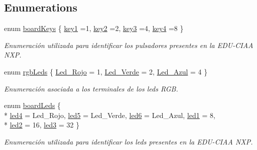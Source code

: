 \subsection*{Enumerations}
\begin{DoxyCompactItemize}
\item 
enum \hyperlink{group__hardware_ga8d70125ca4047f0f7ea513cd8568953d}{board\+Keys} \{ \hyperlink{group__hardware_gga8d70125ca4047f0f7ea513cd8568953da483a28cafb544915d9cd44f2c69fc706}{key1} =1, 
\hyperlink{group__hardware_gga8d70125ca4047f0f7ea513cd8568953dab8d9f65fc5604a8b8a0cdcbaf03bbbe0}{key2} =2, 
\hyperlink{group__hardware_gga8d70125ca4047f0f7ea513cd8568953da376c29473ae1a854ff46b2b171985093}{key3} =4, 
\hyperlink{group__hardware_gga8d70125ca4047f0f7ea513cd8568953da84011848209e666e74469d6dfba542eb}{key4} =8
 \}\begin{DoxyCompactList}\small\item\em Enumeración utilizada para identificar los pulsadores presentes en la E\+D\+U-\/\+C\+I\+AA N\+XP. \end{DoxyCompactList}
\item 
enum \hyperlink{group__hardware_ga84e58e8cc8e3fe349be97bcd3221c360}{rgb\+Leds} \{ \hyperlink{group__hardware_gga84e58e8cc8e3fe349be97bcd3221c360a5662baf6795c7030ea75e47a0019a61d}{Led\+\_\+\+Rojo} = 1, 
\hyperlink{group__hardware_gga84e58e8cc8e3fe349be97bcd3221c360aa5ad7834a37faf1e2620fa3db1838a21}{Led\+\_\+\+Verde} = 2, 
\hyperlink{group__hardware_gga84e58e8cc8e3fe349be97bcd3221c360a90357fded550cd38cda43991725234cb}{Led\+\_\+\+Azul} = 4
 \}\begin{DoxyCompactList}\small\item\em Enumeración asociada a los terminales de los leds R\+GB. \end{DoxyCompactList}
\item 
enum \hyperlink{group__hardware_ga2a000bf02da2abba53355f3fcfdb2d0b}{board\+Leds} \{ \\*
\hyperlink{group__hardware_gga2a000bf02da2abba53355f3fcfdb2d0ba76aaf0c615e41c008aa876ea4c183f4c}{led4} = Led\+\_\+\+Rojo, 
\hyperlink{group__hardware_gga2a000bf02da2abba53355f3fcfdb2d0ba66b97e4de94e08d049b57ac98e315cad}{led5} = Led\+\_\+\+Verde, 
\hyperlink{group__hardware_gga2a000bf02da2abba53355f3fcfdb2d0ba2c4a58277fd326a128900fe0904c2b1e}{led6} = Led\+\_\+\+Azul, 
\hyperlink{group__hardware_gga2a000bf02da2abba53355f3fcfdb2d0bacc803913e7d21f9a6900861008580c5f}{led1} = 8, 
\\*
\hyperlink{group__hardware_gga2a000bf02da2abba53355f3fcfdb2d0ba9c2c88fba1581ccd42348c9e3c47df92}{led2} = 16, 
\hyperlink{group__hardware_gga2a000bf02da2abba53355f3fcfdb2d0ba16d63d90ec9dc8c27019e7c28ff1cfc0}{led3} = 32
 \}\begin{DoxyCompactList}\small\item\em Enumeración utilizada para identificar los leds presentes en la E\+D\+U-\/\+C\+I\+AA N\+XP. \end{DoxyCompactList}
\end{DoxyCompactItemize}
